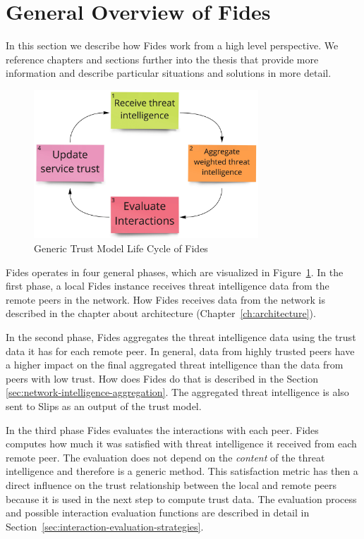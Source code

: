\section{General Overview of Fides}
\label{sec:general-overview-of-fides}
In this section we describe how Fides work from a high level perspective. We reference chapters and sections further into the thesis that provide more information and describe particular situations and solutions in more detail.

\begin{figure}[ht!]
    \centering
    \includegraphics[width=0.75\textwidth]{assets/fides_lifecycle.jpeg}
    \caption{Generic Trust Model Life Cycle of Fides}
    \label{fig:trust-model-life-cycle}
\end{figure}

Fides operates in four general phases, which are visualized in Figure~\ref{fig:trust-model-life-cycle}.
In the first phase, a local Fides instance receives threat intelligence data from the remote peers in the network. 
How Fides receives data from the network is described in the chapter about architecture (Chapter~\ref{ch:architecture}).

In the second phase, Fides aggregates the threat intelligence data using the trust data it has for each remote peer.
In general, data from highly trusted peers have a higher impact on the final aggregated threat intelligence than the data from peers with low trust.
How does Fides do that is described in the Section~ \ref{sec:network-intelligence-aggregation}.
The aggregated threat intelligence is also sent to Slips as an output of the trust model.

In the third phase Fides evaluates the interactions with each peer.
Fides computes how much it was satisfied with threat intelligence it received from each remote peer. The evaluation does not depend on the \textit{content} of the threat intelligence and therefore is a generic method.
This satisfaction metric has then a direct influence on the trust relationship between the local and remote peers because it is used in the next step to compute trust data. 
The evaluation process and possible interaction evaluation functions are described in detail in Section~\ref{sec:interaction-evaluation-strategies}.

